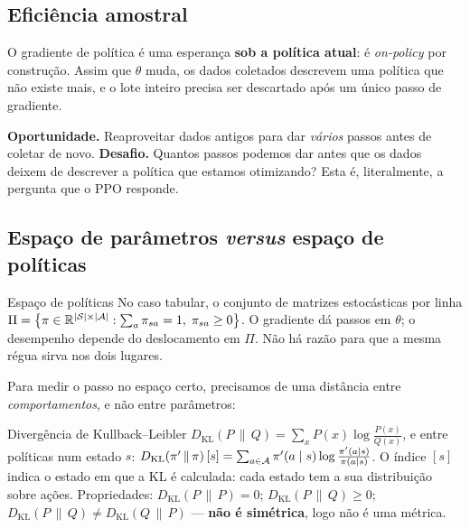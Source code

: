 \documentclass[11pt, a4paper]{article}
\newcommand{\polnovo}{\pol'}
\newcommand{\KLd}[2]{D_{\mathrm{KL}}\!\left(#1\,\|\,#2\right)}
\begin{document}
\subsection{Eficiência amostral}

O gradiente de política é uma esperança \textbf{sob a política atual}: é
\emph{on-policy} por construção. Assim que $\theta$ muda, os dados coletados
descrevem uma política que não existe mais, e o lote inteiro precisa ser
descartado após um único passo de gradiente.

\begin{ideiabox}
\textbf{Oportunidade.} Reaproveitar dados antigos para dar \emph{vários} passos
antes de coletar de novo. \textbf{Desafio.} Quantos passos podemos dar antes que
os dados deixem de descrever a política que estamos otimizando? Esta é,
literalmente, a pergunta que o PPO responde.
\end{ideiabox}

\subsection{Espaço de parâmetros \emph{versus} espaço de políticas}

\begin{defbox}{Espaço de políticas}
No caso tabular, o conjunto de matrizes estocásticas por linha
$\Pi = \left\{\pi \in \mathbb{R}^{\lvert\mathcal{S}\rvert\times\lvert\mathcal{A}\rvert} :
\sum_a \pi_{sa} = 1,\; \pi_{sa}\ge 0\right\}$.
O gradiente dá passos em $\theta$; o desempenho depende do deslocamento em
$\Pi$. Não há razão para que a mesma régua sirva nos dois lugares.
\end{defbox}

Para medir o passo no espaço certo, precisamos de uma distância entre
\emph{comportamentos}, e não entre parâmetros:

\begin{defbox}{Divergência de Kullback--Leibler}
$\KLd{P}{Q} = \sum_x P(x)\log\frac{P(x)}{Q(x)}$, e entre políticas num estado
$s$: $\KLd{\polnovo}{\pol}[s] = \sum_{a\in\gA}\polnovo(a\mid s)\log
\frac{\polnovo(a\mid s)}{\pol(a\mid s)}$. O índice $[s]$ indica o estado em
que a KL é calculada: cada estado tem a sua distribuição sobre ações.
Propriedades: $\KLd{P}{P} = 0$; \; $\KLd{P}{Q}\ge 0$; \;
$\KLd{P}{Q}\ne\KLd{Q}{P}$ --- \textbf{não é simétrica}, logo não é uma métrica.
\end{defbox}
\end{document}
